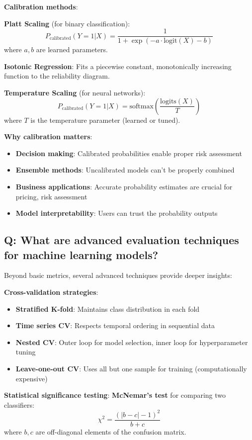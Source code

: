 \textbf{Calibration methods}:

\textbf{Platt Scaling} (for binary classification):
\[
	P_{\text{calibrated}}(Y=1|X) = \frac{1}{1 + \exp(-a \cdot \text{logit}(X) - b)}
\]
where \(a, b\) are learned parameters.

\textbf{Isotonic Regression}:
Fits a piecewise constant, monotonically increasing function to the reliability diagram.

\textbf{Temperature Scaling} (for neural networks):
\[
	P_{\text{calibrated}}(Y=1|X) = \text{softmax}\left(\frac{\text{logits}(X)}{T}\right)
\]
where \(T\) is the temperature parameter (learned or tuned).

\textbf{Why calibration matters}:
\begin{itemize}
	\item \textbf{Decision making}: Calibrated probabilities enable proper risk assessment
	\item \textbf{Ensemble methods}: Uncalibrated models can't be properly combined
	\item \textbf{Business applications}: Accurate probability estimates are crucial for pricing, risk assessment
	\item \textbf{Model interpretability}: Users can trust the probability outputs
\end{itemize}

\subsection*{Q: What are advanced evaluation techniques for machine learning models?}
Beyond basic metrics, several advanced techniques provide deeper insights:

\textbf{Cross-validation strategies}:
\begin{itemize}
	\item \textbf{Stratified K-fold}: Maintains class distribution in each fold
	\item \textbf{Time series CV}: Respects temporal ordering in sequential data
	\item \textbf{Nested CV}: Outer loop for model selection, inner loop for hyperparameter tuning
	\item \textbf{Leave-one-out CV}: Uses all but one sample for training (computationally expensive)
\end{itemize}

\textbf{Statistical significance testing}:
\textbf{McNemar's test} for comparing two classifiers:
\[
	\chi^2 = \frac{(|b - c| - 1)^2}{b + c}
\]
where \(b, c\) are off-diagonal elements of the confusion matrix.

